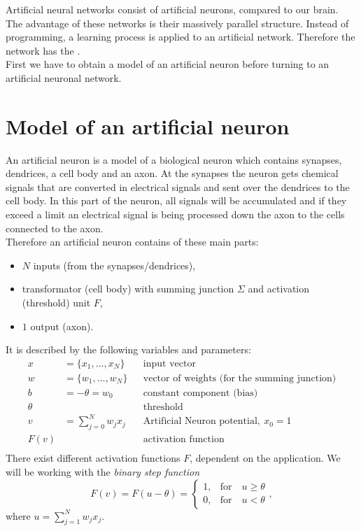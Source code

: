 


Artificial neural networks consist of artificial neurons, compared to our brain. The advantage of these networks is their massively parallel structure. Instead of programming, a learning process is applied to an artificial network. Therefore the network has the \cite[~p.7]{EinfAstroPhys}.\\
First we have to obtain a model of an artificial neuron before turning to an artificial neuronal network.


\section{Model of an artificial neuron}
An artificial neuron is a model of a biological neuron which contains synapses, dendrices, a cell body and an axon. At the synapses the neuron gets chemical signals that are converted in electrical signals and sent over the dendrices to the cell body. In this part of the neuron, all signals will be accumulated and if they exceed a limit an electrical signal is being processed down the axon to the cells connected to the axon.\\
Therefore an artificial neuron contains of these main parts:
\begin{itemize}
\item $N$ inputs (from the synapses/dendrices),
\item transformator (cell body) with summing junction $\Sigma$ and activation (threshold) unit $F$,
\item $1$ output (axon).
\end{itemize}
It is described by the following variables and parameters:
\begin{align*}
x &= \{ x_1,\ldots,x_N \} & &\text{input vector} \\
w &= \{ w_1,\ldots,w_N \} & &\text{vector of weights (for the summing junction)} \\
b &= -\theta = w_0 & &\text{constant component (bias)} \\
\theta & & &\text{threshold} \\
v &= \sum_{j=0}^N w_jx_j & &\text{Artificial Neuron potential},\ x_0=1 \\
F(v) & & &\text{activation function} \\
\end{align*}
There exist different activation functions $F$, dependent on the application. We will be working with the \emph{binary step function}
\[ F(v) = F(u-\theta) = \begin{cases}
1, &\text{for} \quad u\geq\theta \\
0, &\text{for} \quad u < \theta
\end{cases}, \]
where $u=\sum\limits_{j=1}^N w_jx_j$.


